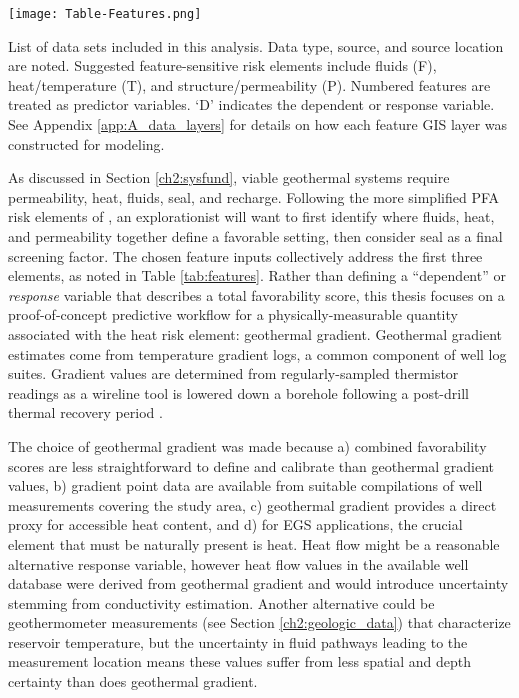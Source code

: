 \begin{table}
\centering
\texttt{[image: Table-Features.png]}
\caption[Southwestern New Mexico feature list]{List of data sets included in this analysis. Data type, source, and source location are noted. Suggested feature-sensitive risk elements include fluids (F), heat/temperature (T), and structure/permeability (P). Numbered features are treated as predictor variables. `D' indicates the dependent or response variable. See Appendix \ref{app:A_data_layers} for details on how each feature GIS layer was constructed for modeling.}
\label{tab:features}
\end{table}

As discussed in Section \ref{ch2:sysfund}, viable geothermal systems require permeability, heat, fluids, seal, and recharge. Following the more simplified PFA risk elements of \citet{bielicki_hydrogeolgic_2015}, an explorationist will want to first identify where fluids, heat, and permeability together define a favorable setting, then consider seal as a final screening factor. The chosen feature inputs collectively address the first three elements, as noted in Table \ref{tab:features}. Rather than defining a ``dependent'' or \textit{response} variable that describes a total favorability score, this thesis focuses on a proof-of-concept predictive workflow for a physically-measurable quantity associated with the heat risk element: geothermal gradient. Geothermal gradient estimates come from temperature gradient logs, a common component of well log suites. Gradient values are determined from regularly-sampled thermistor readings as a wireline tool is lowered down a borehole following a post-drill thermal recovery period \citep{prensky_temperature_1992}.

The choice of geothermal gradient was made because a) combined favorability scores are less straightforward to define and calibrate than geothermal gradient values, b) gradient point data are available from suitable compilations of well measurements covering the study area, c) geothermal gradient provides a direct proxy for accessible heat content, and d) for EGS applications, the crucial element that must be naturally present is heat. Heat flow might be a reasonable alternative response variable, however heat flow values in the available well database were derived from geothermal gradient and would introduce uncertainty stemming from conductivity estimation. Another alternative could be geothermometer measurements (see Section \ref{ch2:geologic_data}) that characterize reservoir temperature, but the uncertainty in fluid pathways leading to the measurement location means these values suffer from less spatial and depth certainty than does geothermal gradient.

